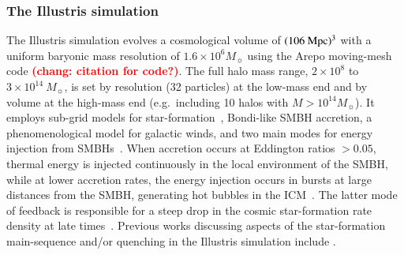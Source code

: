 \documentclass[preprint2,tighten]{aastex62}
\newcommand{\todo}[1]{{\bf \textcolor{red}{ #1}}}
\begin{document}
\subsubsection{The Illustris simulation}
The Illustris simulation \citep{vogelsberger2014,genel2014} evolves a
cosmological volume of $(106\ \rm{Mpc})^3$ with a uniform baryonic mass
resolution of $1.6\times10^6M_{\sun}$ using the Arepo moving-mesh code \todo{(chang: citation for code?)}. 
The full halo mass range, $2 \times 10^8$ to $3\times 10^{14}\ M_{\sun}$, 
is set by resolution (32 particles) at the low-mass end and by volume at 
the high-mass end (e.g.~including 10 halos with $M>10^{14}M_{\sun}$). 
It employs sub-grid models for star-formation~\citep{springel2003},
Bondi-like SMBH accretion, a phenomenological model for galactic winds, and 
two main modes for energy injection from 
SMBHs~\citep[\emph{see}][]{vogelsberger2013}. 
When accretion occurs at Eddington ratios $>0.05$, thermal energy is 
injected continuously in the local environment of the SMBH, while at 
lower accretion rates, the energy injection occurs in bursts at large
distances from the SMBH, generating hot bubbles in the ICM~\citep{sijacki2007}.
The latter mode of feedback is responsible for a steep drop in the 
cosmic star-formation rate density at late times~\citep{vogelsberger2013}.
Previous works discussing aspects of the star-formation main-sequence and/or
quenching in the Illustris simulation include 
\citet{vogelsberger2014, sparre2015, bluck2016, terrazas2017}.
\end{document}
